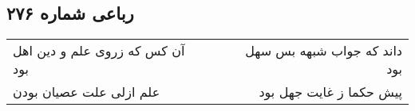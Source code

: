 \begin{center}
\section*{رباعی شماره ۲۷۶}
\label{sec:sh276}
\begin{longtable}{l p{0.5cm} r}
آن کس که زروی علم و دین اهل بود
&&
داند که جواب شبهه بس سهل بود
\\
علم ازلی علت عصیان بودن
&&
پیش حکما ز غایت جهل بود
\\
\end{longtable}
\end{center}
